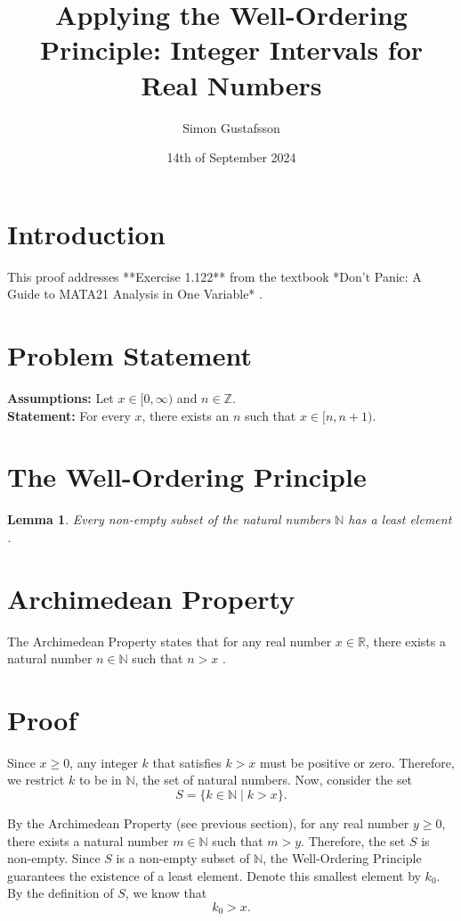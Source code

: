 \documentclass{article}
\title{Applying the Well-Ordering Principle: Integer Intervals for Real Numbers}
\author{Simon Gustafsson}
\date{14th of September 2024}
\newtheorem{lemma}{Lemma}
\begin{document}
\maketitle

\section*{Introduction}
This proof addresses **Exercise 1.122** from the textbook *Don't Panic: A Guide to MATA21 Analysis in One Variable* \cite[pg. 41]{dontpanic}.

\section*{Problem Statement}

\textbf{Assumptions:} Let \( x \in [0, \infty) \) and \( n \in \mathbb{Z} \). \\
\textbf{Statement:} For every \( x \), there exists an \( n \) such that \( x \in [n, n+1) \).

\section*{The Well-Ordering Principle}
\begin{lemma}
Every non-empty subset of the natural numbers \( \mathbb{N} \) has a least element \cite[pg. 41]{dontpanic}.
\end{lemma}

\section*{Archimedean Property}
The Archimedean Property states that for any real number \( x \in \mathbb{R} \), there exists a natural number \( n \in \mathbb{N} \) such that \( n > x \) \cite[pg. 38]{dontpanic}.

\section*{Proof}

Since \( x \geq 0 \), any integer \( k \) that satisfies \( k > x \) must be positive or zero. Therefore, we restrict \( k \) to be in \( \mathbb{N} \), the set of natural numbers. Now, consider the set
\[
S = \{ k \in \mathbb{N} \mid k > x \}.
\]
\vspace{-0.5\baselineskip}

By the Archimedean Property (see previous section), for any real number \( y \geq 0 \), there exists a natural number \( m \in \mathbb{N} \) such that \( m > y \). Therefore, the set \( S \) is non-empty. Since \( S \) is a non-empty subset of \( \mathbb{N} \), the Well-Ordering Principle guarantees the existence of a least element. Denote this smallest element by \( k_0 \). By the definition of \( S \), we know that
\[
k_0 > x.
\]
\vspace{-0.5\baselineskip}
\end{document}
